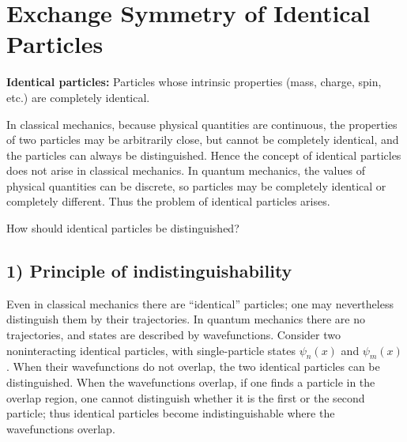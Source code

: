 \section{Exchange Symmetry of Identical Particles}
\textbf{Identical particles:} Particles whose intrinsic properties (mass, charge, spin, etc.) are completely identical.

In classical mechanics, because physical quantities are continuous, the properties of two particles may be arbitrarily close, but cannot be completely identical, and the particles can always be distinguished. Hence the concept of identical particles does not arise in classical mechanics. In quantum mechanics, the values of physical quantities can be discrete, so particles may be completely identical or completely different. Thus the problem of identical particles arises.

How should identical particles be distinguished?

\subsection*{1) Principle of indistinguishability}
Even in classical mechanics there are ``identical'' particles; one may nevertheless distinguish them by their trajectories. In quantum mechanics there are no trajectories, and states are described by wavefunctions. Consider two noninteracting identical particles, with single-particle states $\psi_n(x)$ and $\psi_m(x)$. When their wavefunctions do not overlap, the two identical particles can be distinguished. When the wavefunctions overlap, if one finds a particle in the overlap region, one cannot distinguish whether it is the first or the second particle; thus identical particles become indistinguishable where the wavefunctions overlap.

\begin{center}
\end{center}

